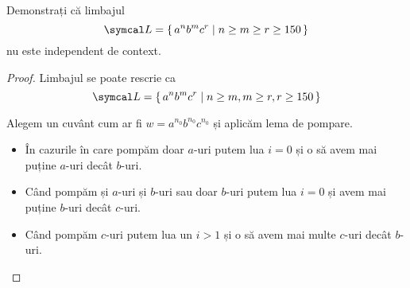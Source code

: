 \begin{exercise}
    Demonstrați că limbajul
    \[\limbaj = \set{ a^n b^m c^r | n \geq m \geq r \geq 150 }\]
    nu este independent de context.
\end{exercise}
\begin{proof}
    Limbajul se poate rescrie ca
    \[\limbaj = \set{ a^n b^m c^r | n \geq m, m \geq r, r \geq 150 }\]

    Alegem un cuvânt cum ar fi \(w = a^{n_0} b^{n_0} c^{n_0}\) și aplicăm lema de pompare.

    \begin{itemize}
        \item În cazurile în care pompăm doar \(a\)-uri putem lua \(i = 0\) și o să avem mai puține \(a\)-uri decât \(b\)-uri.
        \item Când pompăm și \(a\)-uri și \(b\)-uri sau doar \(b\)-uri putem lua \(i = 0\) și avem mai puține \(b\)-uri decât \(c\)-uri.
        \item Când pompăm \(c\)-uri putem lua un \(i > 1\) și o să avem mai multe \(c\)-uri decât \(b\)-uri.
    \end{itemize}
\end{proof}
